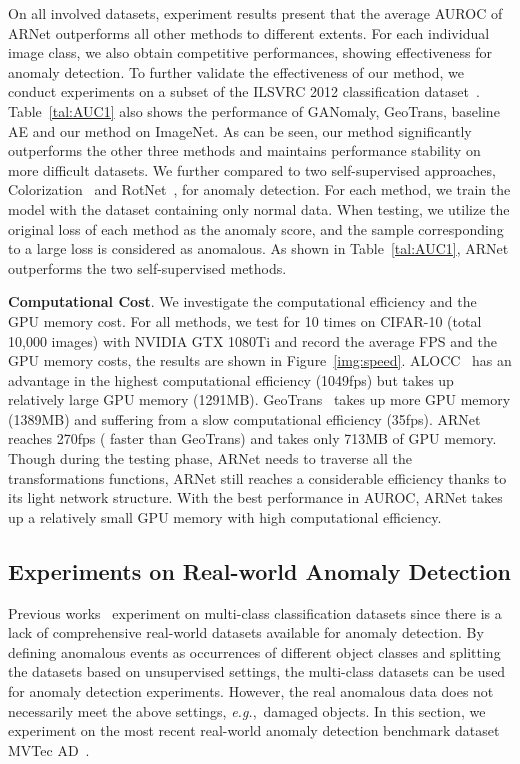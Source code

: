 \documentclass[journal]{IEEEtran}
\begin{document}
On all involved datasets, experiment results present that the average AUROC of ARNet outperforms all other methods to different extents. For each individual image class, we also obtain competitive performances, showing effectiveness for anomaly detection. To further validate the effectiveness of our method, we conduct experiments on a subset of the ILSVRC 2012 classification dataset~\cite{russakovsky2015imagenet}. Table~\ref{tal:AUC1} also shows the performance of GANomaly, GeoTrans, baseline AE and our method on ImageNet. As can be seen, our method significantly outperforms the other three methods and maintains performance stability on more difficult datasets. We further compared to two self-supervised approaches, Colorization~\cite{zhang2016colorful} and RotNet~\cite{gidaris2018unsupervised}, for anomaly detection. For each method, we train the model with the dataset containing only normal data. When testing, we utilize the original loss of each method as the anomaly score, and the sample corresponding to a large loss is considered as anomalous. As shown in Table~\ref{tal:AUC1}, ARNet outperforms the two self-supervised methods.

\noindent \textbf{Computational Cost}. We investigate the computational efficiency and the GPU memory cost. For all methods, we test for 10 times on CIFAR-10 (total 10,000 images) with NVIDIA GTX 1080Ti and record the average FPS and the GPU memory costs, the results are shown in Figure~\ref{img:speed}. ALOCC~\cite{Sabokrou2018Adversarially} has an advantage in the highest computational efficiency (1049fps) but takes up relatively large GPU memory (1291MB). GeoTrans~\cite{golan2018deep} takes up more GPU memory (1389MB) and suffering from a slow computational efficiency (35fps). ARNet reaches 270fps ( faster than GeoTrans) and takes only 713MB of GPU memory. Though during the testing phase, ARNet needs to traverse all the transformations functions, ARNet still reaches a considerable efficiency thanks to its light network structure. With the best performance in AUROC, ARNet takes up a relatively small GPU memory with high computational efficiency.

\subsection{Experiments on Real-world Anomaly Detection}

Previous works~\cite{golan2018deep,deecke2018image} experiment on multi-class classification datasets since there is a lack of comprehensive real-world datasets available for anomaly detection. By defining anomalous events as occurrences of different object classes and splitting the datasets based on unsupervised settings, the multi-class datasets can be used for anomaly detection experiments. However, the real anomalous data does not necessarily meet the above settings, \emph{e.g.},~damaged objects. In this section, we experiment on the most recent real-world anomaly detection benchmark dataset MVTec AD~\cite{bergmann2019mvtec}.
\end{document}

